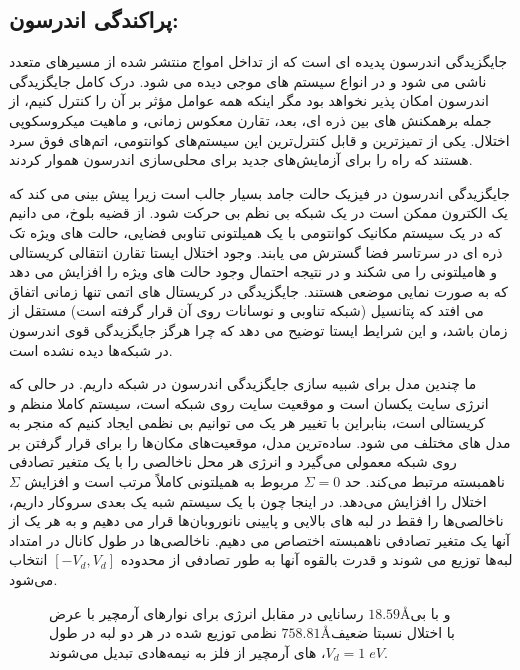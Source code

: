\subsection{پراکندگی اندرسون:}
جایگزیدگی اندرسون پدیده ای است که از تداخل امواج منتشر شده از مسیرهای متعدد ناشی می شود و در انواع سیستم های موجی دیده می شود. درک کامل جایگزیدگی اندرسون امکان پذیر نخواهد بود مگر اینکه همه عوامل مؤثر بر آن را کنترل کنیم، از جمله برهمکنش های بین ذره ای، بعد، تقارن معکوس زمانی، و ماهیت میکروسکوپی اختلال. یکی از تمیزترین و قابل کنترل‌ترین این سیستم‌های کوانتومی، اتم‌های فوق سرد هستند که راه را برای آزمایش‌های جدید برای محلی‌سازی اندرسون هموار کردند.

جایگزیدگی اندرسون در فیزیک حالت جامد بسیار جالب است زیرا پیش بینی می کند که یک الکترون ممکن است در یک شبکه بی نظم بی حرکت شود. از قضیه بلوخ، می دانیم که در یک سیستم مکانیک کوانتومی با یک همیلتونی تناوبی فضایی، حالت های ویژه تک ذره ای در سرتاسر فضا گسترش می یابند. وجود اختلال ایستا تقارن انتقالی کریستالی و هامیلتونی را می شکند و در نتیجه احتمال وجود حالت های ویژه را افزایش می دهد که به صورت نمایی موضعی هستند. جایگزیدگی در کریستال های اتمی تنها زمانی اتفاق می افتد که پتانسیل (شبکه تناوبی و نوسانات روی آن قرار گرفته است) مستقل از زمان باشد، و این شرایط ایستا توضیح می دهد که چرا هرگز جایگزیدگی قوی اندرسون در شبکه‌ها دیده نشده است.

ما چندین مدل برای شبیه سازی جایگزیدگی اندرسون در شبکه داریم. در حالی که انرژی سایت یکسان است و موقعیت سایت روی شبکه است، سیستم کاملا منظم و کریستالی است، بنابراین با تغییر هر یک می توانیم بی نظمی ایجاد کنیم که منجر به مدل های مختلف می شود. ساده‌ترین مدل، موقعیت‌های مکان‌ها را برای قرار گرفتن بر روی شبکه معمولی می‌گیرد و انرژی هر محل ناخالصی را با یک متغیر تصادفی ناهمبسته مرتبط می‌کند. حد $\Sigma= 0$ مربوط به همیلتونی کاملاً مرتب است و افزایش $\Sigma$ اختلال را افزایش می‌دهد. در اینجا چون با یک سیستم شبه یک بعدی سروکار داریم، ناخالصی‌ها را فقط در لبه های بالایی و پایینی نانوروبان‌ها قرار می دهیم و به هر یک از آنها یک متغیر تصادفی ناهمبسته اختصاص می دهیم. ناخالصی‌ها در طول کانال در امتداد لبه‌ها توزیع می شوند و قدرت بالقوه آنها به طور تصادفی از محدوده $[-V_d,V_d]$ انتخاب می‌شود.

\begin{figure}[!ht]
    \centering
      
      \caption{رسانایی در مقابل انرژی برای نوارهای آرمچیر با عرض $18.59$\AA و با بی نظ‌‌می‌‌ توزیع شده در هر دو لبه در طول $758.81$\AA با اختلال نسبتا ضعیف $V_d=1\;eV$،  های آرمچیر از فلز به نیمه‌هادی تبدیل ‌‌می‌‌شوند.}
      \label{armdisorder}
    \end{figure}
    

